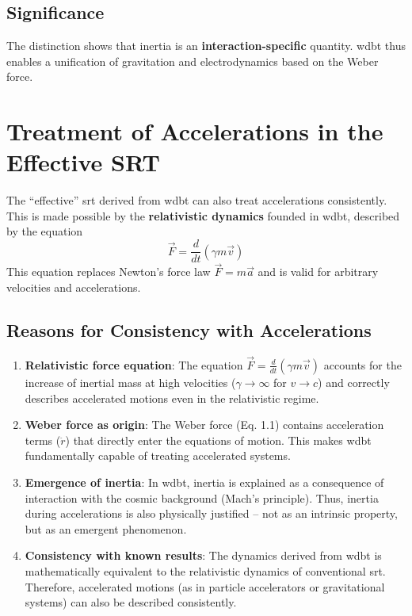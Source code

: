 \subsection{Significance}
The distinction shows that inertia is an \textbf{interaction-specific} quantity. \gls{wdbt} thus enables a unification of gravitation and electrodynamics based on the Weber force.

\section{Treatment of Accelerations in the Effective SRT}

The \enquote{effective} \gls{srt} derived from \gls{wdbt} can also treat accelerations consistently. This is made possible by the \textbf{relativistic dynamics} founded in \gls{wdbt}, described by the equation
\[
\vec{F} = \frac{d}{dt}(\gamma m \vec{v})
\]
This equation replaces Newton's force law $\vec{F} = m \vec{a}$ and is valid for arbitrary velocities and accelerations.

\subsection{Reasons for Consistency with Accelerations}

\begin{enumerate}
    \item \textbf{Relativistic force equation}: The equation $\vec{F} = \frac{d}{dt}(\gamma m \vec{v})$ accounts for the increase of inertial mass at high velocities ($\gamma \to \infty$ for $v \to c$) and correctly describes accelerated motions even in the relativistic regime.
    \item \textbf{Weber force as origin}: The Weber force (Eq. 1.1) contains acceleration terms ($\ddot{r}$) that directly enter the equations of motion. This makes \gls{wdbt} fundamentally capable of treating accelerated systems.
    \item \textbf{Emergence of inertia}: In \gls{wdbt}, inertia is explained as a consequence of interaction with the cosmic background (Mach's principle). Thus, inertia during accelerations is also physically justified – not as an intrinsic property, but as an emergent phenomenon.    
    \item \textbf{Consistency with known results}: The dynamics derived from \gls{wdbt} is mathematically equivalent to the relativistic dynamics of conventional \gls{srt}. Therefore, accelerated motions (as in particle accelerators or gravitational systems) can also be described consistently.
\end{enumerate}

